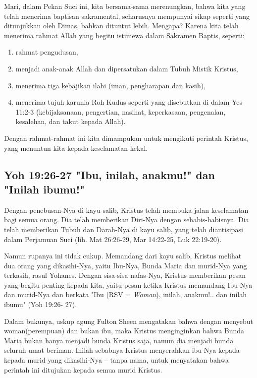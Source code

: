 Mari, dalam Pekan Suci ini, kita bersama-sama merenungkan, bahwa kita yang
telah menerima baptisan sakramental, seharusnya mempunyai sikap seperti yang
ditunjukkan oleh Dimas, bahkan dituntut lebih. Mengapa? Karena kita telah
menerima rahmat Allah yang begitu istimewa dalam Sakramen Baptis, seperti: 
\begin{enumerate}[label=(\alph{enumi})]
\item rahmat pengudusan, 
\item menjadi anak-anak Allah dan dipersatukan dalam Tubuh
Mistik Kristus, 
\item menerima tiga kebajikan ilahi (iman, pengharapan dan
kasih), 
\item menerima tujuh karunia Roh Kudus seperti yang disebutkan di dalam
Yes 11:2-3 (kebijaksanaan, pengertian, nasihat, keperkasaan, pengenalan,
kesalehan, dan takut kepada Allah). 
\end{enumerate}

Dengan rahmat-rahmat ini kita dimampukan
untuk mengikuti perintah Kristus, yang menuntun kita kepada keselamatan kekal.

\subsection{Yoh 19:26-27 "Ibu, inilah, anakmu!" dan "Inilah ibumu!"}
Dengan penebusan-Nya di kayu salib, Kristus telah membuka jalan keselamatan
bagi semua orang. Dia telah memberikan Diri-Nya dengan sehabis-habisnya. Dia
telah memberikan Tubuh dan Darah-Nya di kayu salib, yang telah diantisipasi
dalam Perjamuan Suci (lih. Mat 26:26-29, Mar 14:22-25, Luk 22:19-20). 

Namun
rupanya ini tidak cukup. Memandang dari kayu salib, Kristus melihat dua orang
yang dikasihi-Nya, yaitu Ibu-Nya, Bunda Maria dan murid-Nya yang terkasih,
rasul Yohanes. Dengan sisa-sisa nafas-Nya, Kristus memberikan pesan yang begitu
penting kepada kita, yaitu pesan ketika Kristus memandang Ibu-Nya dan murid-Nya
dan berkata "Ibu (RSV = \textit{Woman}), inilah, anakmu!.. dan inilah ibumu" (Yoh 19:26-
27). 

Dalam bukunya, uskup agung Fulton Sheen mengatakan bahwa dengan menyebut
woman(perempuan) dan bukan ibu, maka Kristus menginginkan bahwa Bunda Maria
bukan hanya menjadi bunda Kristus saja, namun dia menjadi bunda seluruh umat
beriman. Inilah sebabnya Kristus menyerahkan ibu-Nya kepada  kepada murid yang
dikasihi-Nya – tanpa nama, untuk menyatakan bahwa perintah ini ditujukan kepada
semua murid Kristus.

